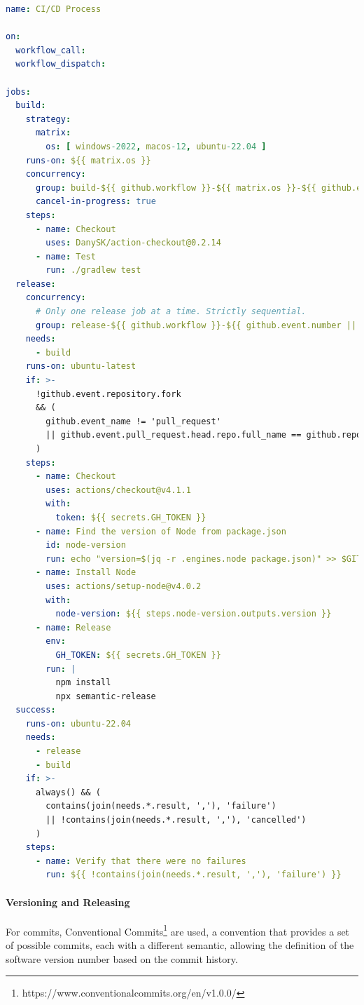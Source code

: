 \documentclass[12pt,a4paper,openright,twoside]{book}
\begin{document}
\begin{lstlisting}[language=yaml, caption={CI/CD workflow}]
name: CI/CD Process

on:
  workflow_call:
  workflow_dispatch:

jobs:
  build:
    strategy:
      matrix:
        os: [ windows-2022, macos-12, ubuntu-22.04 ]
    runs-on: ${{ matrix.os }}
    concurrency:
      group: build-${{ github.workflow }}-${{ matrix.os }}-${{ github.event.number || github.ref }}
      cancel-in-progress: true
    steps:
      - name: Checkout
        uses: DanySK/action-checkout@0.2.14
      - name: Test
        run: ./gradlew test
  release:
    concurrency:
      # Only one release job at a time. Strictly sequential.
      group: release-${{ github.workflow }}-${{ github.event.number || github.ref }}
    needs:
      - build
    runs-on: ubuntu-latest
    if: >-
      !github.event.repository.fork
      && (
        github.event_name != 'pull_request'
        || github.event.pull_request.head.repo.full_name == github.repository
      )
    steps:
      - name: Checkout
        uses: actions/checkout@v4.1.1
        with:
          token: ${{ secrets.GH_TOKEN }}
      - name: Find the version of Node from package.json
        id: node-version
        run: echo "version=$(jq -r .engines.node package.json)" >> $GITHUB_OUTPUT
      - name: Install Node
        uses: actions/setup-node@v4.0.2
        with:
          node-version: ${{ steps.node-version.outputs.version }}
      - name: Release
        env:
          GH_TOKEN: ${{ secrets.GH_TOKEN }}
        run: |
          npm install
          npx semantic-release
  success:
    runs-on: ubuntu-22.04
    needs:
      - release
      - build
    if: >-
      always() && (
        contains(join(needs.*.result, ','), 'failure')
        || !contains(join(needs.*.result, ','), 'cancelled')
      )
    steps:
      - name: Verify that there were no failures
        run: ${{ !contains(join(needs.*.result, ','), 'failure') }}
\end{lstlisting}

\paragraph*{Versioning and Releasing}
For commits, Conventional Commits\footnote{https://www.conventionalcommits.org/en/v1.0.0/} are used, a convention that provides a set of possible commits, 
each with a different semantic, allowing the definition of the software version number based on the commit history.
\end{document}
